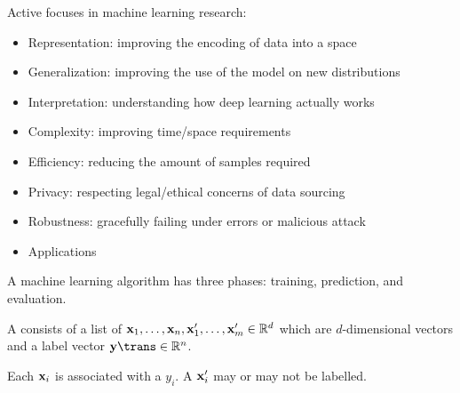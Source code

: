 \documentclass[class=cs480,notes,tikz]{agony}
\begin{document}
Active focuses in machine learning research:
\begin{itemize}[nosep]
  \item Representation: improving the encoding of data into a space
  \item Generalization: improving the use of the model on new distributions
  \item Interpretation: understanding how deep learning actually works
  \item Complexity: improving time/space requirements
  \item Efficiency: reducing the amount of samples required
  \item Privacy: respecting legal/ethical concerns of data sourcing
  \item Robustness: gracefully failing under errors or malicious attack
  \item Applications
\end{itemize}

A machine learning algorithm has three phases:
training, prediction, and evaluation.

\begin{defn}[dataset]
  A  consists of a list of 
  $\vb x_1,\dotsc, \vb x_n, \vb x_1', \dotsc, \vb x_m' \in \mathbb{R}^d$
  which are $d$-dimensional vectors and a label vector $\vb y\trans \in \R^n$.

  Each  $\vb x_i$ is associated with a  $y_i$.
  A  $\vb x'_i$ may or may not be labelled.
\end{defn}
\end{document}
